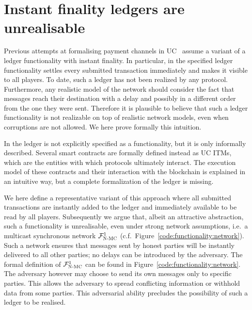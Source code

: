 \section{Instant finality ledgers are unrealisable}
\label{sec:perfect-ledger}
  Previous attempts at formalising payment channels in
  UC~\cite{DBLP:conf/ccs/DziembowskiFH18,Malavolta:2017:CPP:3133956.3134096,sprites,perun}
  assume a variant of a ledger functionality with instant finality. In
  particular, in
  \cite{DBLP:conf/ccs/DziembowskiFH18,perun,Malavolta:2017:CPP:3133956.3134096}
  the specified ledger functionality settles every submitted transaction
  immediately and makes it visible to all players. To date, such a ledger has
  not been realized by any protocol. Furthermore, any realistic model of the
  network should consider the fact that messages reach their destination with a
  delay and possibly in a different order from the one they were sent. Therefore
  it is plausible to believe that such a ledger functionality is not realizable
  on top of realistic network models, even when corruptions are not allowed. We
  here prove formally this intuition.

  In \cite{sprites} the ledger is not explicitly specified as a functionality,
  but it is only informally described. Several smart contracts are formally
  defined instead as UC ITMs, which are the entities with which protocols
  ultimately interact. The execution model of these contracts and their
  interaction with the blockchain is explained in an intuitive way, but a
  complete formalization of the ledger is missing.

  We here define a representative variant of this approach \perfectledger{}
  where all submitted transactions are instantly added to the ledger and
  immediately available to be read by all players. Subsequently we argue that,
  albeit an attractive abstraction, such a functionality is unrealisable, even
  under strong network assumptions, i.e.\ a multicast synchronous network
  $\mathcal{F}_{\textsc{N-MC}}^1$ (c.f.\ Figure~\ref{code:functionality:network}). Such a
  network ensures that messages sent by honest parties
  will be instantly delivered to all other parties; no delays can be introduced
  by the adversary. The formal definition of $\mathcal{F}_{\textsc{N-MC}}^1$ can be found in
  Figure~\ref{code:functionality:network}. The
  adversary however may choose to send its own messages only to specific
  parties. This allows the adversary to spread conflicting information or
  withhold data from some parties. This adversarial ability precludes the
  possibility of such a ledger to be realised.

